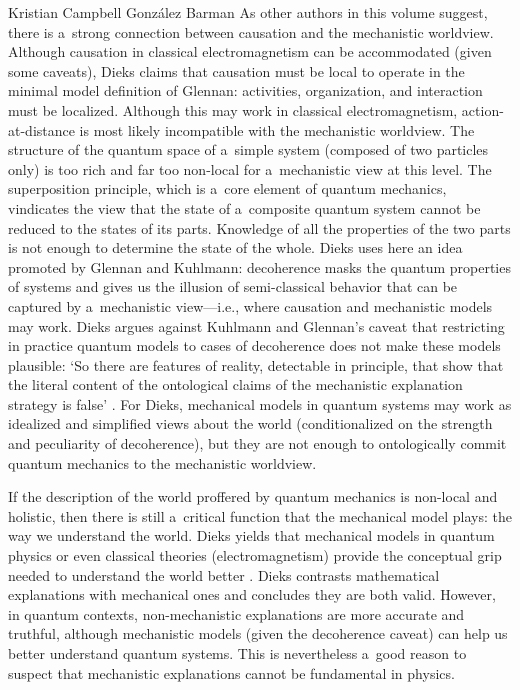 \begin{recengenv}{Kristian Campbell González Barman}
As other authors in this volume suggest, there is a~strong connection between causation and the mechanistic worldview. Although causation in classical electromagnetism can be accommodated (given some caveats), Dieks claims that causation must be local to operate in the minimal model definition of Glennan: activities, organization, and interaction must be localized. Although this may work in classical electromagnetism, action-at-distance is most likely incompatible with the mechanistic worldview. The structure of the quantum space of a~simple system (composed of two particles only) is too rich and far too non-local for a~mechanistic view at this level. The superposition principle, which is a~core element of quantum mechanics, vindicates the view that the state of a~composite quantum system cannot be reduced to the states of its parts. Knowledge of all the properties of the two parts is not enough to determine the state of the whole. Dieks uses here an idea promoted by Glennan and Kuhlmann: decoherence masks the quantum properties of systems and gives us the illusion of semi-classical behavior that can be captured by a~mechanistic view---i.e., where causation and mechanistic models may work. Dieks argues against Kuhlmann and Glennan's caveat that restricting in practice quantum models to cases of decoherence does not make these models plausible: ‘So there are features of reality, detectable in principle, that show that the literal content of the ontological claims of the mechanistic explanation strategy is false'
\parencite*[][p.60]{falkenburg_mechanistic_2019}. %
 For Dieks, mechanical models in quantum systems may work as idealized and simplified views about the world (conditionalized on the strength and peculiarity of decoherence), but they are not enough to ontologically commit quantum mechanics to the mechanistic worldview.

If the description of the world proffered by quantum mechanics is non-local and holistic, then there is still a~critical function that the mechanical model plays: the way we understand the world. Dieks yields that mechanical models in quantum physics or even classical theories (electromagnetism) provide the conceptual grip needed to understand the world better
\parencite*[][p.63]{falkenburg_mechanistic_2019}. %
 Dieks contrasts mathematical explanations with mechanical ones and concludes they are both valid. However, in quantum contexts, non-mechanistic explanations are more accurate and truthful, although mechanistic models (given the decoherence caveat) can help us better understand quantum systems. This is nevertheless a~good reason to suspect that mechanistic explanations cannot be fundamental in physics.


\end{recengenv}
